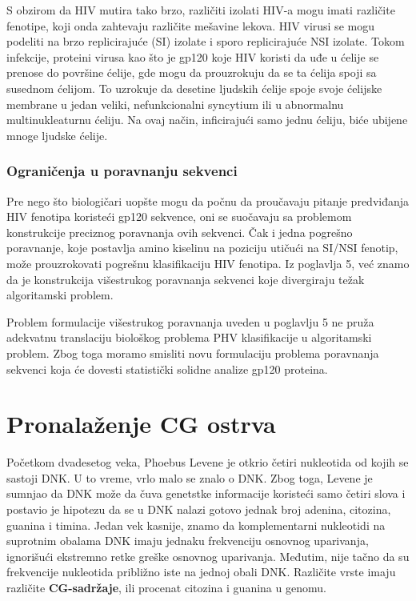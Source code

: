 S obzirom da HIV mutira tako brzo, različiti izolati HIV-a mogu imati različite fenotipe, koji onda zahtevaju različite mešavine lekova. HIV virusi se mogu podeliti na brzo replicirajuće (SI) izolate i sporo replicirajuće NSI izolate. Tokom infekcije, proteini virusa kao što je gp120 koje HIV koristi da uđe u ćelije se prenose do površine ćelije, gde mogu da prouzrokuju da se ta ćelija spoji sa susednom ćelijom. To uzrokuje da desetine ljudskih ćelije spoje svoje ćelijske membrane u jedan veliki, nefunkcionalni syncytium ili u abnormalnu multinukleaturnu ćeliju. Na ovaj način, inficirajući samo jednu ćeliju, biće ubijene mnoge ljudske ćelije.

\subsubsection{Ograničenja u poravnanju sekvenci}

Pre nego što biologičari uopšte mogu da počnu da proučavaju pitanje predviđanja HIV fenotipa koristeći gp120 sekvence, oni se suočavaju sa problemom konstrukcije preciznog poravnanja ovih sekvenci. Čak i jedna pogrešno poravnanje, koje postavlja amino kiselinu na poziciju utičući na SI/NSI fenotip, može prouzrokovati pogrešnu klasifikaciju HIV fenotipa. Iz poglavlja 5, već znamo da je konstrukcija višestrukog poravnanja sekvenci koje divergiraju težak algoritamski problem. 

Problem formulacije višestrukog poravnanja uveden u poglavlju 5 ne pruža adekvatnu translaciju biološkog problema PHV klasifikacije u algoritamski problem. Zbog toga moramo smisliti novu formulaciju problema poravnanja sekvenci koja će dovesti statistički solidne analize gp120 proteina.

\section{Pronalaženje CG ostrva}

Početkom dvadesetog veka, Phoebus Levene je otkrio četiri nukleotida od kojih se sastoji DNK. U to vreme, vrlo malo se znalo o DNK. Zbog toga, Levene je sumnjao da DNK može da čuva genetstke informacije koristeći samo četiri slova i postavio je hipotezu da se u DNK nalazi gotovo jednak broj adenina, citozina, guanina i timina. Jedan vek kasnije, znamo da komplementarni nukleotidi na suprotnim obalama DNK imaju jednaku frekvenciju osnovnog uparivanja, ignorišući ekstremno retke greške osnovnog uparivanja. Međutim, nije tačno da su frekvencije nukleotida približno iste na jednoj obali DNK. Različite vrste imaju različite \textbf{CG-sadržaje}, ili procenat citozina i guanina u genomu.

